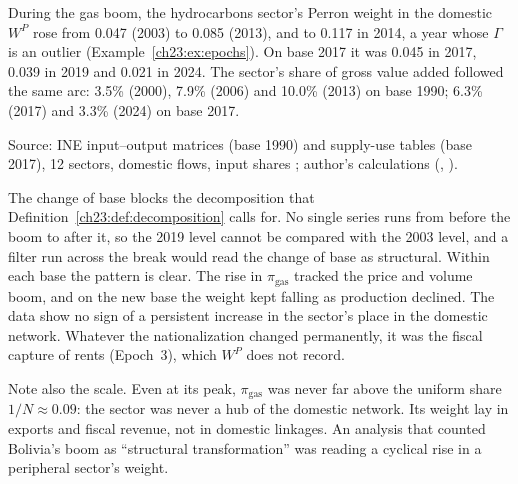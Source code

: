 \documentclass[../structural_economics_book.tex]{subfiles}
\begin{document}
\begin{example}\label{ch23:ex:decomposition}
During the gas boom, the hydrocarbons sector's Perron weight in the domestic $W^P$ rose from 0.047 (2003) to 0.085 (2013), and to 0.117 in 2014, a year whose $\Gamma$ is an outlier (Example~\ref{ch23:ex:epochs}). On base 2017 it was 0.045 in 2017, 0.039 in 2019 and 0.021 in 2024. The sector's share of gross value added followed the same arc: 3.5\% (2000), 7.9\% (2006) and 10.0\% (2013) on base 1990; 6.3\% (2017) and 3.3\% (2024) on base 2017.
\par{\footnotesize Source: INE input--output matrices (base 1990) and supply-use tables (base 2017), 12 sectors, domestic flows, input shares \citep{ine2026sut}; author's calculations (, ).\par}

The change of base blocks the decomposition that Definition~\ref{ch23:def:decomposition} calls for. No single series runs from before the boom to after it, so the 2019 level cannot be compared with the 2003 level, and a filter run across the break would read the change of base as structural. Within each base the pattern is clear. The rise in $\pi_{\text{gas}}$ tracked the price and volume boom, and on the new base the weight kept falling as production declined. The data show no sign of a persistent increase in the sector's place in the domestic network. Whatever the nationalization changed permanently, it was the fiscal capture of rents (Epoch~3), which $W^P$ does not record.

Note also the scale. Even at its peak, $\pi_{\text{gas}}$ was never far above the uniform share $1/N \approx 0.09$: the sector was never a hub of the domestic network. Its weight lay in exports and fiscal revenue, not in domestic linkages. An analysis that counted Bolivia's boom as ``structural transformation'' was reading a cyclical rise in a peripheral sector's weight.
\end{example}
\end{document}
